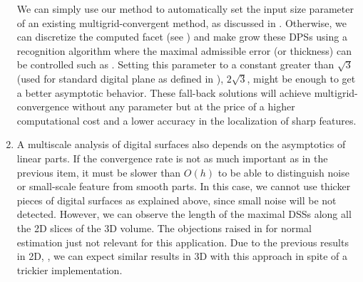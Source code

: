 \begin{enumerate}[label=(R\arabic*)]
We can simply use our method to automatically set the input size
parameter of an existing multigrid-convergent method, as discussed in .
Otherwise, we can discretize the computed facet (see ) and make grow these
DPSs using a recognition algorithm where the maximal admissible error (or thickness) can
be controlled such as \cite{Charrier2008}. Setting this parameter to a constant greater
than $\sqrt{3}$ (used for standard digital plane as defined in ),
\eg $2\sqrt{3}$, might be enough to get a better asymptotic behavior. These fall-back
solutions will achieve multigrid-convergence without any parameter but at the price of
a higher computational cost and a lower accuracy in the localization of sharp features. 
 \label{riskestim}
\item %
A multiscale analysis of digital surfaces also depends on the asymptotics of linear parts.
If the convergence rate is not as much important as in the previous item, it must be slower
than $O(h)$ to be able to distinguish noise or small-scale feature from smooth parts.
In this case, we cannot use thicker pieces of digital surfaces as explained above, since
small noise will be not detected. However, we can observe the length of the maximal DSSs
along all the 2D slices of the 3D volume. The objections raised in  for
normal estimation just not relevant for this application. Due to the previous results in 2D,
\cite{Kerautret2012}, we can expect similar results in 3D with this approach in spite of a
trickier implementation.
 \label{riskscale}
\end{enumerate}
